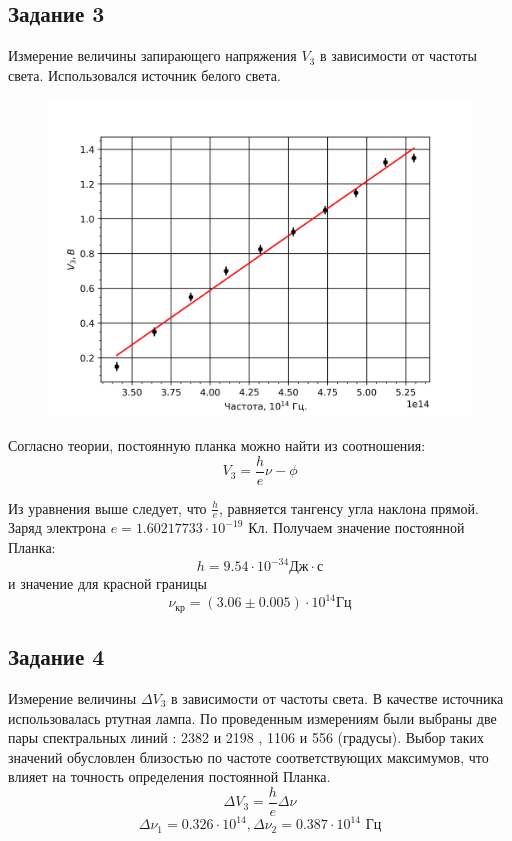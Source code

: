 \subsection{Задание 3}
Измерение величины запирающего напряжения $V_3$ в зависимости от частоты света. Использовался источник белого света.
\begin{figure}[H]
	\centering
	\includegraphics[width=\linewidth]{graphs/pt3}
	\caption{}
	\label{fig:7}
\end{figure}
Согласно теории, постоянную планка можно найти из соотношения:
	$$V_{3}=\frac he \nu-\phi$$

	Из уравнения выше следует, что $\frac he $, равняется тангенсу угла наклона прямой. Заряд электрона $
 e=1.60217733\cdot10^{-19}$ Кл. Получаем значение постоянной Планка:
  $$h=9.54\cdot10^{-34}\text{Дж}\cdot\text{с}$$
  и значение для красной границы $$\nu_{\text{кр}} = (3.06 \pm 0.005)\cdot10^{14} \text{Гц}$$
  
 
  \subsection{Задание 4}
  Измерение величины $\Delta V_3$ в зависимости от частоты света. В качестве источника использовалась ртутная лампа. По
  проведенным измерениям были выбраны две пары спектральных линий : 2382 и 2198 , 1106 и 556 (градусы). Выбор таких
  значений обусловлен близостью по частоте соответствующих максимумов, что влияет на точность определения постоянной
  Планка.
  $$\Delta V_{3}=\frac he \Delta \nu$$
  $$\Delta \nu_1 = 0.326 \cdot 10^{14}, \Delta \nu_2 = 0.387 \cdot 10^{14} \text{ Гц}$$
  
